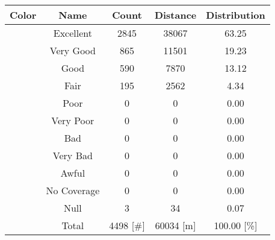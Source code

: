 \begin{tabular}{|c|c|c|c|c|}\hline
\rowcolor{Plum!20}
Color&Name&Count&Distance&Distribution\\\hline\hline
\cellcolor[HTML]{00703c} &Excellent&2845&38067&63.25\\\hline
\cellcolor[HTML]{00a032} &Very Good&865&11501&19.23\\\hline
\cellcolor[HTML]{00d228} &Good&590&7870&13.12\\\hline
\cellcolor[HTML]{ffff00} &Fair&195&2562&4.34\\\hline
\cellcolor[HTML]{ffaa00} &Poor&0&0&0.00\\\hline
\cellcolor[HTML]{fa6400} &Very Poor&0&0&0.00\\\hline
\cellcolor[HTML]{ff0000} &Bad&0&0&0.00\\\hline
\cellcolor[HTML]{dc143c} &Very Bad&0&0&0.00\\\hline
\cellcolor[HTML]{820000} &Awful&0&0&0.00\\\hline
\cellcolor[HTML]{aaaaaa} &No Coverage&0&0&0.00\\\hline
\cellcolor[HTML]{000000} &Null&3&34&0.07\\\hline
\cellcolor[HTML]{ffffff} &Total&4498 [\#]&60034 [m]&100.00 [\%]\\\hline
\end{tabular}
